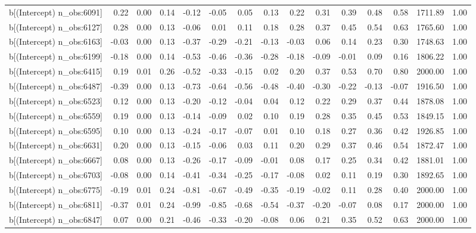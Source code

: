 \begin{table}[ht]
\begin{tabular}{rrrrrrrrrrrrrrr}
  b[(Intercept) n\_obs:6091] & 0.22 & 0.00 & 0.14 & -0.12 & -0.05 & 0.05 & 0.13 & 0.22 & 0.31 & 0.39 & 0.48 & 0.58 & 1711.89 & 1.00 \\ 
  b[(Intercept) n\_obs:6127] & 0.28 & 0.00 & 0.13 & -0.06 & 0.01 & 0.11 & 0.18 & 0.28 & 0.37 & 0.45 & 0.54 & 0.63 & 1765.60 & 1.00 \\ 
  b[(Intercept) n\_obs:6163] & -0.03 & 0.00 & 0.13 & -0.37 & -0.29 & -0.21 & -0.13 & -0.03 & 0.06 & 0.14 & 0.23 & 0.30 & 1748.63 & 1.00 \\ 
  b[(Intercept) n\_obs:6199] & -0.18 & 0.00 & 0.14 & -0.53 & -0.46 & -0.36 & -0.28 & -0.18 & -0.09 & -0.01 & 0.09 & 0.16 & 1806.22 & 1.00 \\ 
  b[(Intercept) n\_obs:6415] & 0.19 & 0.01 & 0.26 & -0.52 & -0.33 & -0.15 & 0.02 & 0.20 & 0.37 & 0.53 & 0.70 & 0.80 & 2000.00 & 1.00 \\ 
  b[(Intercept) n\_obs:6487] & -0.39 & 0.00 & 0.13 & -0.73 & -0.64 & -0.56 & -0.48 & -0.40 & -0.30 & -0.22 & -0.13 & -0.07 & 1916.50 & 1.00 \\ 
  b[(Intercept) n\_obs:6523] & 0.12 & 0.00 & 0.13 & -0.20 & -0.12 & -0.04 & 0.04 & 0.12 & 0.22 & 0.29 & 0.37 & 0.44 & 1878.08 & 1.00 \\ 
  b[(Intercept) n\_obs:6559] & 0.19 & 0.00 & 0.13 & -0.14 & -0.09 & 0.02 & 0.10 & 0.19 & 0.28 & 0.35 & 0.45 & 0.53 & 1849.15 & 1.00 \\ 
  b[(Intercept) n\_obs:6595] & 0.10 & 0.00 & 0.13 & -0.24 & -0.17 & -0.07 & 0.01 & 0.10 & 0.18 & 0.27 & 0.36 & 0.42 & 1926.85 & 1.00 \\ 
  b[(Intercept) n\_obs:6631] & 0.20 & 0.00 & 0.13 & -0.15 & -0.06 & 0.03 & 0.11 & 0.20 & 0.29 & 0.37 & 0.46 & 0.54 & 1872.47 & 1.00 \\ 
  b[(Intercept) n\_obs:6667] & 0.08 & 0.00 & 0.13 & -0.26 & -0.17 & -0.09 & -0.01 & 0.08 & 0.17 & 0.25 & 0.34 & 0.42 & 1881.01 & 1.00 \\ 
  b[(Intercept) n\_obs:6703] & -0.08 & 0.00 & 0.14 & -0.41 & -0.34 & -0.25 & -0.17 & -0.08 & 0.02 & 0.11 & 0.19 & 0.30 & 1892.65 & 1.00 \\ 
  b[(Intercept) n\_obs:6775] & -0.19 & 0.01 & 0.24 & -0.81 & -0.67 & -0.49 & -0.35 & -0.19 & -0.02 & 0.11 & 0.28 & 0.40 & 2000.00 & 1.00 \\ 
  b[(Intercept) n\_obs:6811] & -0.37 & 0.01 & 0.24 & -0.99 & -0.85 & -0.68 & -0.54 & -0.37 & -0.20 & -0.07 & 0.08 & 0.17 & 2000.00 & 1.00 \\ 
  b[(Intercept) n\_obs:6847] & 0.07 & 0.00 & 0.21 & -0.46 & -0.33 & -0.20 & -0.08 & 0.06 & 0.21 & 0.35 & 0.52 & 0.63 & 2000.00 & 1.00 \\ 

\end{tabular}
\end{table}
